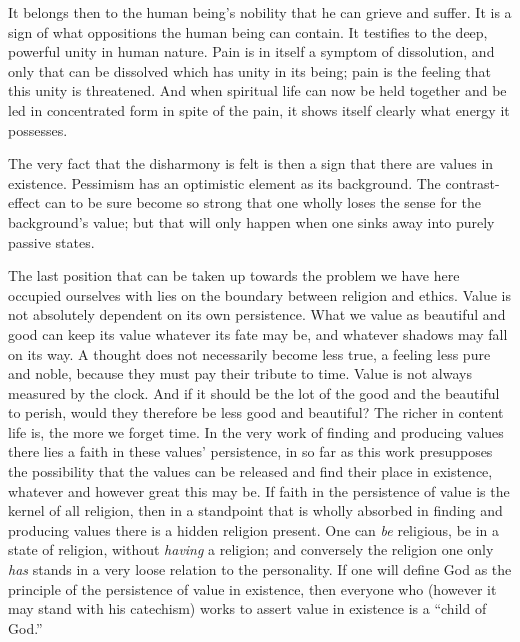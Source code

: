\documentclass[12pt,a4paper]{book}
\newcommand{\opage}[1]{\marginnote{\footnotesize\textit{[#1]}}}
\begin{document}
It belongs then to the human being's nobility that he can grieve and suffer. It is a sign of what
oppositions the human being can contain. It testifies to the deep, powerful unity in human nature. Pain is
in itself a symptom of dissolution, and only that can be dissolved which has unity in its being; pain is
the feeling that this unity is threatened. And when spiritual life can now be held together and be led in
concentrated form in spite of the pain, it shows itself clearly what energy it possesses.

The very fact that the disharmony is felt is then a sign that there are values in existence. Pessimism has
an optimistic element as its background. The contrast-effect can to be sure become so strong that one
wholly loses the sense for the background's value; but that will only happen when one sinks away into
purely passive states.

The last position that can be taken up towards the problem we have here occupied ourselves with lies on the
boundary between religion and ethics. Value is not absolutely dependent on its own persistence. What we
value as beautiful and good can keep its value whatever its fate may be, and whatever shadows may fall on
its way. A thought does not necessarily become less true, a feeling less pure and noble, because they must
pay their tribute to time. Value is not always measured by the clock. And if it should be the lot of the
good 
\opage{185}and the beautiful to perish, would they therefore be less good and beautiful? The richer in content
life is, the more we forget time. In the very work of finding and producing values there lies a faith in
these values' persistence, in so far as this work presupposes the possibility that the values can be
released and find their place in existence, whatever and however great this may be. If faith in the
persistence of value is the kernel of all religion, then in a standpoint that is wholly absorbed in finding
and producing values there is a hidden religion present. One can \emph{be} religious, be in a state of
religion, without \emph{having} a religion; and conversely the religion one only \emph{has} stands in a
very loose relation to the personality. If one will define God as the principle of the persistence of value
in existence, then everyone who (however it may stand with his catechism) works to assert value in existence
is a ``child of God.''

\medskip
\end{document}
